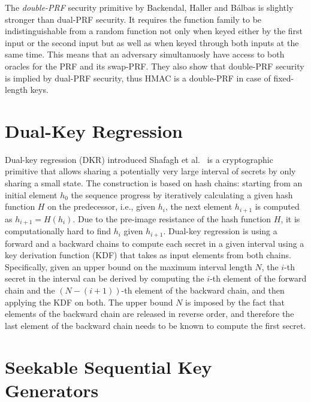 The \textit{double-PRF} security primitive by Backendal, Haller 
and B{\'a}lbas is slightly stronger than dual-PRF security.
It requires the function family to be indistinguishable from a random 
function not only when keyed either by the first input or the second input
but as well as when keyed through both inputs at the same time.
This means that an adversary simultanuosly have access to both 
oracles for the PRF and its swap-PRF.
They also show that double-PRF security is implied by dual-PRF security,
thus HMAC is a double-PRF in case of fixed-length keys.

\section{Dual-Key Regression}\label{sc:DKR}

Dual-key regression (DKR) introduced Shafagh et al.~\cite{USENIX:SBRH20} is a
cryptographic primitive that allows sharing a potentially very large interval 
of secrets by only sharing a small state.
The construction is based on hash chains: starting from an initial
element $h_0$ the sequence progress by iteratively calculating
a given hash function $H$ on the predecessor,
i.e., given $h_i$, the next element $h_{i+1}$ is computed as $h_{i+1} = H(h_i)$.
Due to the pre-image resistance of the hash function $H$, 
it is computationally hard to find $h_i$ given $h_{i+1}$.
Dual-key regression is using a forward and a backward chains 
to compute each secret in a given interval using a key derivation function (KDF)
that takes as input elements from both chains.
Specifically, given an upper bound on the maximum interval length $N$,
the $i$-th secret in the interval can be derived by computing
the $i$-th element of the forward chain and the $(N-(i + 1))$-th element
of the backward chain, and then applying the KDF on both.
The upper bound $N$ is imposed by the fact that elements of the
backward chain are released in reverse order, and therefore
the last element of the backward chain needs to be known to compute
the first secret.

\section{Seekable Sequential Key Generators}\label{sc:SSKG}

